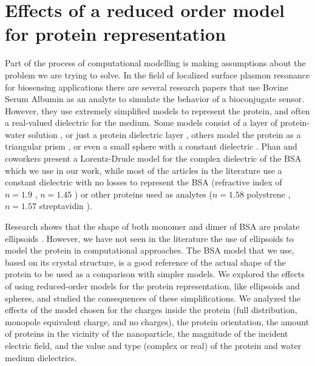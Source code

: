 \chapter{Effects of a reduced order model for protein representation}
\graphicspath{{rom_studies/figs/}}

Part of the process of computational modelling is making assumptions about the problem we are trying to solve. In the 
field of localized surface plasmon resonance for biosensing applications there are several research papers that use Bovine Serum Albumin 
as an analyte to simulate the behavior of a bioconjugate sensor. However, they use extremely simplified models
to represent the protein, and often a real-valued dielectric for the medium. Some models consist of  
a layer of protein-water solution \cite{PhanETal2013}, 
or just a protein dielectric layer \cite{NghiemETal2012}, others model the
protein as a triangular prism \cite{DanHu2014}, or even a small sphere with a 
constant dielectric \cite{AntosiewiczApellClaudioKall2011, DavisGomezVernon2010,SantiagoCordobaETal2011, UngerETal2009}. Phan and 
coworkers \cite{PhanETal2013} present a Lorentz-Drude model for the complex 
dielectric of the BSA which we use in our work, while most of the articles in the literature 
use a constant dielectric with no losses to represent the BSA 
(refractive index of $n= 1.9$ \cite{NghiemETal2012}, $n= 1.45$ \cite{SantiagoCordobaETal2011}) or
other proteins used as analytes ($n=1.58$ polystrene \cite{UngerETal2009}, $n=1.57$ 
streptavidin \cite{ShenETal2013}). 

Research shows that the shape of both monomer and dimer of BSA are prolate ellipsoids 
\cite{MoserETal1966, SquireETal1968, WrightETal1975}. However, we have not seen in the literature the use of ellipsoids 
to model the protein in computational approaches. The BSA model that we use, based on its crystal 
structure, is a good reference of the actual shape of the protein to be used as a comparison with simpler models. We 
explored the effects of using reduced-order models for the protein representation, like ellipsoids and spheres, and
studied the consequences of these simplifications. We analyzed the effects of the model chosen 
for the charges inside the protein (full distribution, monopole equivalent charge, and no charges), the protein orientation, the 
amount of proteins in the vicinity of the nanoparticle, the magnitude of the incident electric field, and the value and type (complex or real)
of the protein and water medium dielectrics. 

